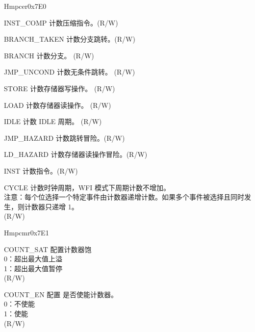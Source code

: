\begin{register}{H}{mpcer}{0x7E0}\label{regdesc:MPCER}
%
%
%
%
%
%
%
%
%
%
%
%
\regnewline%
\begin{regdesc}\begin{reglist}
\label{fielddesc:INST_COMP}\item [INST\_COMP] 计数压缩指令。(R/W)
\label{fielddesc:BRANCH_TAKEN}\item [BRANCH\_TAKEN] 计数分支跳转。(R/W)  
\label{fielddesc:BRANCH}\item [BRANCH] 计数分支。 (R/W) 
\label{fielddesc:JUMP_UNCONDITIONAL}\item [JMP\_UNCOND] 计数无条件跳转。 (R/W) 
\label{fielddesc:STORE}\item [STORE] 计数存储器写操作。 (R/W) 
\label{fielddesc:LOAD}\item  [LOAD] 计数存储器读操作。 (R/W) 
\label{fielddesc:IDLE}\item  [IDLE] 计数 IDLE 周期。 (R/W) 
\label{fielddesc:JUMP_HAZARDS}\item  [JMP\_HAZARD] 计数跳转冒险。(R/W) 
\label{fielddesc:LOAD_HAZARDS}\item  [LD\_HAZARD] 计数存储器读操作冒险。(R/W) 
\label{fielddesc:INSTRUCTION}\item  [INST] 计数指令。(R/W) 
\label{fielddesc:CYCLES}\item  [CYCLE] 计数时钟周期，WFI 模式下周期计数不增加。\\
注意：每个位选择一个特定事件由计数器递增计数。如果多个事件被选择且同时发生，则计数器只递增 1。\\
(R/W)

\end{reglist}\end{regdesc}
\end{register}

\begin{register}{H}{mpcmr}{0x7E1}\label{regdesc:MPCMR}
%
%
%
\regnewline%
\begin{regdesc}\begin{reglist}
\label{fielddesc:COUNTER_SATURATION}\item [COUNT\_SAT] 配置计数器饱\\
0：超出最大值上溢\\
1：超出最大值暂停\\
(R/W)
\label{fielddesc:COUNTER_ENABLE}\item [COUNT\_EN] 配置 是否使能计数器。\\
0：不使能\\
1：使能\\
(R/W)
\end{reglist}\end{regdesc}
\end{register}

